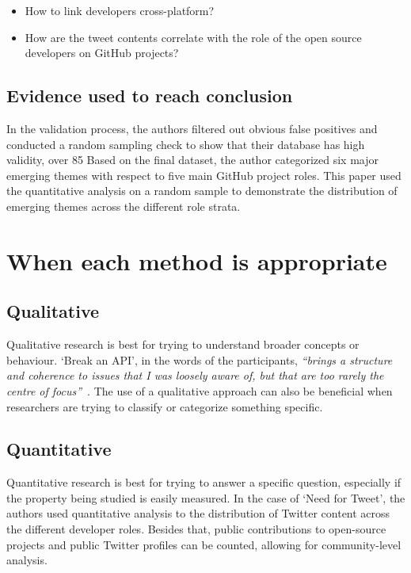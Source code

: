\documentclass[12pt]{IEEEtran}
\begin{document}
\begin{itemize}
    \item How to link developers cross-platform?
    \item How are the tweet contents correlate with the role of the open source developers on GitHub projects?
\end{itemize}
\subsection{Evidence used to reach conclusion}
In the validation process, the authors filtered out obvious false positives and conducted a random sampling check to show that their database has high validity, over 85%
Based on the final dataset, the author categorized six major emerging themes with respect to five main GitHub project roles.
This paper used the quantitative analysis on a random sample to demonstrate the distribution of emerging themes across the different role strata.



\section{When each method is appropriate}

\subsection{Qualitative}

Qualitative research is best for trying to understand broader concepts or behaviour.
`Break an API', in the words of the participants, \textit{ ``brings a structure and coherence to issues that I was loosely aware of, but that are too rarely the centre of focus''}~\cite{bogart2016break}.
The use of a qualitative approach can also be beneficial when researchers are trying to classify or categorize something specific.
\subsection{Quantitative}

Quantitative research is best for trying to answer a specific question, especially if the property being studied is easily measured. In the case of `Need for Tweet', the authors used quantitative analysis to the distribution of Twitter content across the different developer roles. Besides that, public contributions to open-source projects and public Twitter profiles can be counted, allowing for community-level analysis.
\end{document}
